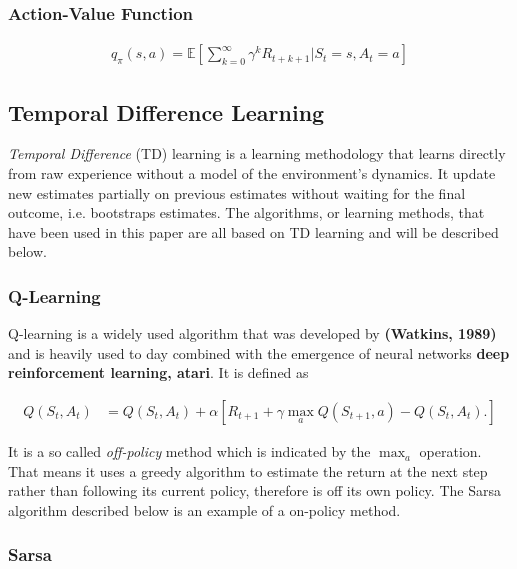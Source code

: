 \documentclass[result.tex]{subfiles}
\begin{document}
    \subsubsection*{Action-Value Function}

    \begin{align*}
        q_{\pi}(s, a) = \mathbb{E} \left[ \sum_{k=0}^{\infty} \gamma^k R_{t + k + 1} \bigg\rvert S_t = s, A_t = a \right]
    \end{align*}

    \subsection*{Temporal Difference Learning}

    \textit{Temporal Difference} (TD) learning is a learning methodology that learns directly from raw experience without a model of the environment's dynamics. It update new estimates partially on previous estimates without waiting for the final outcome, i.e. bootstraps estimates. The algorithms, or learning methods, that have been used in this paper are all based on TD learning and will be described below.

    \subsubsection*{Q-Learning}

    Q-learning is a widely used algorithm that was developed by \textbf{(Watkins, 1989)} and is heavily used to day combined with the emergence of neural networks \textbf{deep reinforcement learning, atari}. It is defined as

    \begin{align*}
        Q(S_t, A_t) &=
        Q(S_t , A_t) +
        \alpha \left[
        R_{t + 1} +
        \gamma \max_a Q(S_{t + 1}, a) - Q(S_t, A_t).
        \right]
    \end{align*}

    It is a so called \textit{off-policy} method which is indicated by the $\max_a$ operation. That means it uses a greedy algorithm to estimate the return at the next step rather than following its current policy, therefore is off its own policy. The Sarsa algorithm described below is an example of a on-policy method.

    \subsubsection*{Sarsa}
\end{document}

